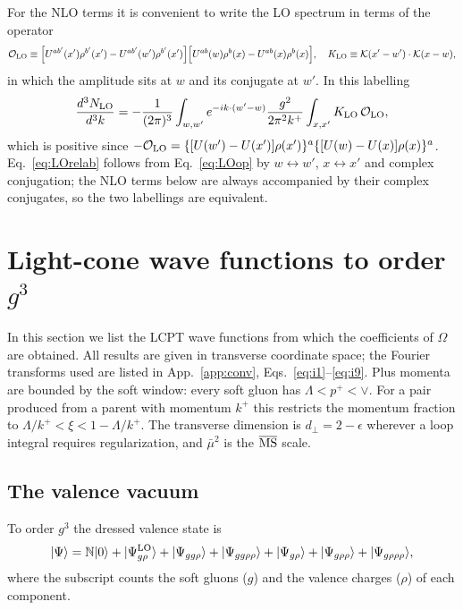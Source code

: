 \documentclass[aps,prd,onecolumn,superscriptaddress,nofootinbib,floatfix,longbibliography,11pt]{revtex4-2}
\numberwithin{equation}{section}
\newcommand{\KK}{\mathcal{K}}
\def\mf#1{\mathbb{#1}}
\newcommand{\pre}{\frac{1}{(2\pi)^3}\int_{w,w'}e^{-ik\cdot(w'-w)}}
\newcommand{\Ord}{\mathcal{O}}
\newcommand{\MSbar}{\overline{\rm MS}}
\begin{document}
For the NLO terms it is convenient to write the LO spectrum in terms of the operator
\begin{equation}
\Ord_{\rm LO}\equiv\Big[U^{ab'}(x')\rho^{b'}(x')-U^{ab'}(w')\rho^{b'}(x')\Big]\Big[U^{ab}(w)\rho^b(x)-U^{ab}(x)\rho^b(x)\Big],\quad K_{\rm LO}\equiv\KK(x'-w')\cdot\KK(x-w),
\label{eq:OLO}
\end{equation}
in which the amplitude sits at $w$ and its conjugate at $w'$. In this labelling
\begin{equation}
\frac{d^3N_{\rm LO}}{d^3k}=-\pre\frac{g^2}{2\pi^2k^+}\int_{x,x'}K_{\rm LO}\,\Ord_{\rm LO},
\label{eq:LOrelab}
\end{equation}
which is positive since $-\Ord_{\rm LO}=\{[U(w')-U(x')]\rho(x')\}^a\{[U(w)-U(x)]\rho(x)\}^a$. Eq.~\eqref{eq:LOrelab} follows from Eq.~\eqref{eq:LOop} by $w\leftrightarrow w'$, $x\leftrightarrow x'$ and complex conjugation; the NLO terms below are always accompanied by their complex conjugates, so the two labellings are equivalent.
\section{Light-cone wave functions to order \texorpdfstring{$g^3$}{g3}}\label{sec:lcwf}

In this section we list the LCPT wave functions from which the coefficients of $\Omega$ are obtained. All results are given in transverse coordinate space; the Fourier transforms used are listed in App.~\ref{app:conv}, Eqs.~\eqref{eq:i1}--\eqref{eq:i9}. Plus momenta are bounded by the soft window: every soft gluon has $\Lambda<p^+<\vee$. For a pair produced from a parent with momentum $k^+$ this restricts the momentum fraction to $\Lambda/k^+<\xi<1-\Lambda/k^+$. The transverse dimension is $d_\perp=2-\epsilon$ wherever a loop integral requires regularization, and $\bar\mu^2$ is the $\MSbar$ scale.

\subsection{The valence vacuum}\label{sec:vac}

To order $g^3$ the dressed valence state is
\begin{equation}
|\Psi\rangle=\mf N|0\rangle+|\Psi^{\rm LO}_{g\rho}\rangle+|\Psi_{gg\rho}\rangle+|\Psi_{gg\rho\rho}\rangle+|\Psi_{g\rho}\rangle+|\Psi_{g\rho\rho}\rangle+|\Psi_{g\rho\rho\rho}\rangle,
\label{eq:NLOWF}
\end{equation}
where the subscript counts the soft gluons ($g$) and the valence charges ($\rho$) of each component.
\end{document}
